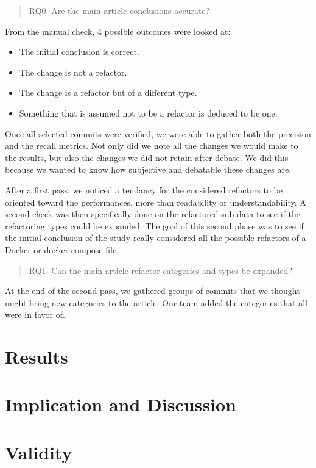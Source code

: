 \documentclass[lettersize,journal]{IEEEtran}
\begin{document}
\begin{quote}
        RQ0. Are the main article conclusions accurate?
\end{quote}
From the manual check, 4 possible outcomes were looked at:
\begin{itemize}
        \item The initial conclusion is correct.
        \item The change is not a refactor.
        \item The change is a refactor but of a different type.
        \item Something that is assumed not to be a refactor is deduced to be one.
\end{itemize}
Once all selected commits were verified, we were able to gather both the precision and the recall metrics.
Not only did we note all the changes we would make to the results, but also the changes we did not retain after debate.
We did this because we wanted to know how subjective and debatable these changes are.

After a first pass, we noticed a tendancy for the considered refactors to be oriented toward the performances, more than readability or understandability.
A second check was then specifically done on the refactored sub-data to see if the refactoring types could be expanded.
The goal of this second phase was to see if the initial conclusion of the study really considered all the possible refactors of a Docker or docker-compose file.

\begin{quote}
        RQ1. Can the main article refactor categories and types be expanded?
\end{quote}
At the end of the second pass, we gathered groups of commits that we thought might bring new categories to the article.
Our team added the categories that all were in favor of.

\section{Results}

\section{Implication and Discussion}

\section{Validity}
\end{document}
